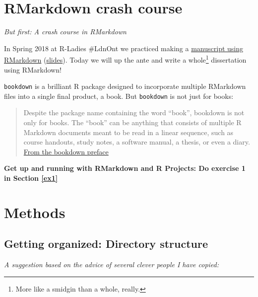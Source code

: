\documentclass[
  12pt,
  oneside]{book}
\numberwithin{figure}{chapter}
\begin{document}
\hypertarget{rmd-crash-course}{%
\chapter{RMarkdown crash course}\label{rmd-crash-course}}

\emph{But first: A crash course in RMarkdown}

In Spring 2018 at R-Ladies \#LdnOnt we practiced making a \href{https://github.com/rladies/meetup-presentations_london_ontario/tree/master/2018-03-06_rmarkdown}{manuscript using RMarkdown} (\href{http://rpubs.com/thealk/368020}{slides}).
Today we will up the ante and write a whole\footnote{More like a smidgin than a whole, really.} dissertation using RMarkdown!

\texttt{bookdown} is a brilliant R package designed to incorporate multiple RMarkdown files into a single final product, a book. But \texttt{bookdown} is not just for books:

\begin{quote}
Despite the package name containing the word ``book'', bookdown is not only for books. The ``book'' can be anything that consists of multiple R Markdown documents meant to be read in a linear sequence, such as course handouts, study notes, a software manual, a thesis, or even a diary. \href{https://bookdown.org/yihui/bookdown/}{From the bookdown preface}
\end{quote}

\textbf{Get up and running with RMarkdown and R Projects: Do exercise 1 in Section \ref{ex1}}

\hypertarget{methods}{%
\chapter{Methods}\label{methods}}

\hypertarget{getting-organized-directory-structure}{%
\section{Getting organized: Directory structure}\label{getting-organized-directory-structure}}

\emph{A suggestion based on the advice of several clever people I have copied:}
\end{document}
